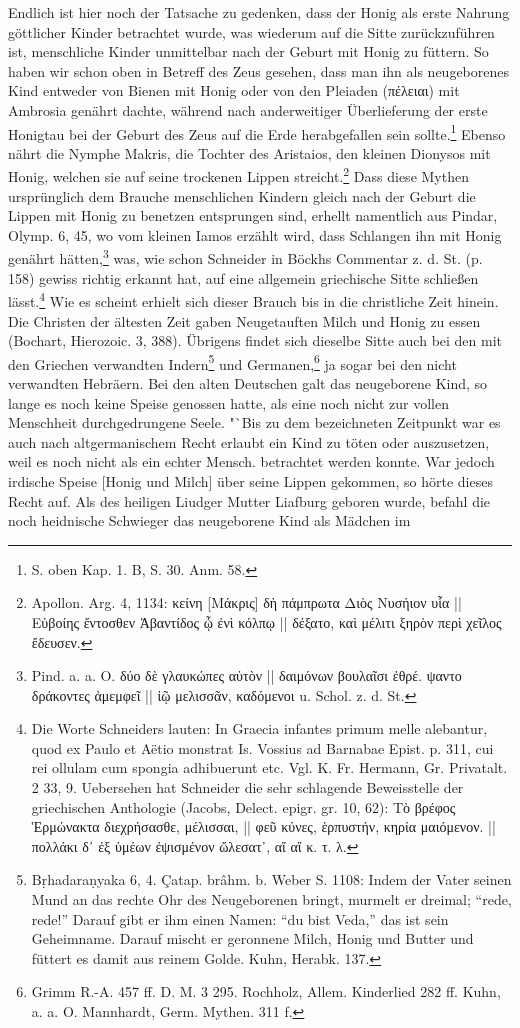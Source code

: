 \documentclass[a4paper, 11pt, oneside]{article}
\begin{document}
Endlich ist hier noch der Tatsache zu gedenken, dass der Honig als erste Nahrung göttlicher Kinder betrachtet wurde, was wiederum auf die Sitte zurückzuführen ist, menschliche Kinder unmittelbar nach der Geburt mit Honig zu füttern. So haben wir schon oben in Betreff des Zeus gesehen, dass man ihn als neugeborenes Kind entweder von Bienen mit Honig oder von den Pleiaden (πέλειαι) mit Ambrosia genährt dachte, während nach anderweitiger Überlieferung der erste Honigtau bei der Geburt des Zeus auf die Erde herabgefallen sein sollte.\footnote{S. oben Kap. 1. B, S. 30. Anm. 58.} Ebenso nährt die Nymphe Makris, die Tochter des Aristaios, den kleinen Dionysos mit Honig, welchen sie auf seine trockenen Lippen streicht.\footnote{Apollon. Arg. 4, 1134: κείνη [Μάκρις] δὴ πάμπρωτα Διὸς Νυσήιον υἷα || Εὐβοίης ἔντοσθεν Ἀβαντίδος ᾧ ἐνὶ κόλπῳ || δέξατο, καὶ μέλιτι ξηρὸν περὶ χεῖλος ἔδευσεν.} Dass diese Mythen ursprünglich dem Brauche menschlichen Kindern gleich nach der Geburt die Lippen mit Honig zu benetzen entsprungen sind, erhellt namentlich aus Pindar, Olymp. 6, 45, wo vom kleinen Iamos erzählt wird, dass Schlangen ihn mit Honig genährt hätten,\footnote{Pind. a. a. O. δύο δὲ γλαυκώπες αὐτὸν || δαιμόνων βουλαῖσι ἐθρέ. ψαντο δράκοντες ἀμεμφεῖ || ἰῷ μελισσᾶν, καδόμενοι u. Schol. z. d. St.} was, wie schon Schneider in Böckhs Commentar z. d. St. (p. 158) gewiss richtig erkannt hat, auf eine allgemein griechische Sitte schließen lässt.\footnote{Die Worte Schneiders lauten: In Graecia infantes primum melle alebantur, quod ex Paulo et Aëtio monstrat Is. Vossius ad Barnabae Epist. p. 311, cui rei ollulam cum spongia adhibuerunt etc. Vgl. K. Fr. Hermann, Gr. Privatalt. 2 33, 9. Uebersehen hat Schneider die sehr schlagende Beweisstelle der griechischen Anthologie (Jacobs, Delect. epigr. gr. 10, 62): Τὸ βρέφος Ἑρμώνακτα διεχρήσασθε, μέλισσαι, || φεῦ κύνες, ἑρπυστήν, κηρία μαιόμενον. || πολλάκι δ᾽ ἐξ ὑμέων ἐψισμένον ὤλεσατ᾽, αἴ αἴ κ. τ. λ.} Wie es scheint erhielt sich dieser Brauch bis in die christliche Zeit hinein. Die Christen der ältesten Zeit gaben Neugetauften Milch und Honig zu essen (Bochart, Hierozoic. 3, 388). Übrigens findet sich dieselbe Sitte auch bei den mit den Griechen verwandten Indern\footnote{Bṛhadaraṇyaka 6, 4. Çatap. brâhm. b. Weber S. 1108: Indem der Vater seinen Mund an das rechte Ohr des Neugeborenen bringt, murmelt er dreimal; "`rede, rede!"' Darauf gibt er ihm einen Namen: "`du bist Veda,"' das ist sein Geheimname. Darauf mischt er geronnene Milch, Honig und Butter und füttert es damit aus reinem Golde. Kuhn, Herabk. 137.} und Germanen,\footnote{Grimm R.-A. 457 ff. D. M. 3 295. Rochholz, Allem. Kinderlied 282 ff. Kuhn, a. a. O. Mannhardt, Germ. Mythen. 311 f.} ja sogar bei den nicht verwandten Hebräern. Bei den alten Deutschen galt das neugeborene Kind, so lange es noch keine Speise genossen hatte, als eine noch nicht zur vollen Menschheit durchgedrungene Seele. "`Bis zu dem bezeichneten Zeitpunkt war es auch nach altgermanischem Recht erlaubt ein Kind zu töten oder auszusetzen, weil es noch nicht als ein echter Mensch. betrachtet werden konnte. War jedoch irdische Speise [Honig und Milch] über seine Lippen gekommen, so hörte dieses Recht auf. Als des heiligen Liudger Mutter Liafburg geboren wurde, befahl die noch heidnische Schwieger das neugeborene Kind als Mädchen im 
\end{document}
